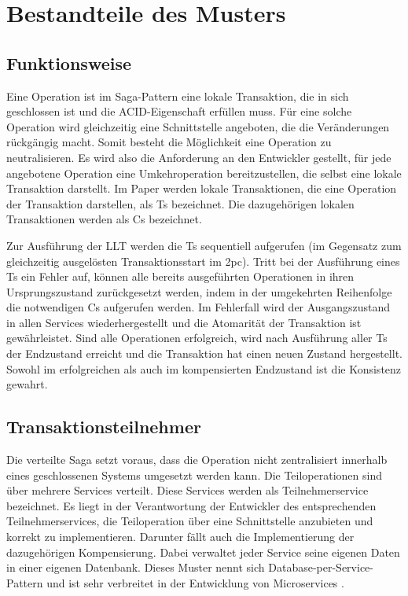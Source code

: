 \section{Bestandteile des Musters}
\subsection{Funktionsweise}
Eine Operation ist im Saga-Pattern eine lokale Transaktion, die in sich geschlossen ist und die ACID-Eigenschaft erfüllen muss. Für eine solche Operation wird gleichzeitig eine Schnittstelle angeboten, die die Veränderungen rückgängig macht. Somit besteht die Möglichkeit eine Operation zu neutralisieren. Es wird also die Anforderung an den Entwickler gestellt, für jede angebotene Operation eine Umkehroperation bereitzustellen, die selbst eine lokale Transaktion darstellt. 
Im Paper werden lokale Transaktionen, die eine Operation der Transaktion darstellen, als Ts bezeichnet. Die dazugehörigen lokalen Transaktionen werden als Cs bezeichnet. 

Zur Ausführung der LLT werden die Ts sequentiell aufgerufen (im Gegensatz zum gleichzeitig ausgelösten Transaktionsstart im \acrshort{2pc}). Tritt bei der Ausführung eines Ts ein Fehler auf, können alle bereits ausgeführten Operationen in ihren Ursprungszustand zurückgesetzt werden, indem in der umgekehrten Reihenfolge die notwendigen Cs aufgerufen werden. Im Fehlerfall wird der Ausgangszustand in allen Services wiederhergestellt und die Atomarität der Transaktion ist gewährleistet. Sind alle Operationen erfolgreich, wird nach Ausführung aller Ts der Endzustand erreicht und die Transaktion hat einen neuen Zustand hergestellt. Sowohl im erfolgreichen als auch im kompensierten Endzustand ist die Konsistenz gewahrt.

\subsection{Transaktionsteilnehmer}
Die verteilte Saga setzt voraus, dass die Operation nicht zentralisiert innerhalb eines geschlossenen Systems umgesetzt werden kann. Die Teiloperationen sind über mehrere Services verteilt. Diese Services werden als Teilnehmerservice bezeichnet. Es liegt in der Verantwortung der Entwickler des entsprechenden Teilnehmerservices, die Teiloperation über eine Schnittstelle anzubieten und korrekt zu implementieren. Darunter fällt auch die Implementierung der dazugehörigen Kompensierung. Dabei verwaltet jeder Service seine eigenen Daten in einer eigenen Datenbank. Dieses Muster nennt sich Database-per-Service-Pattern und ist sehr verbreitet in der Entwicklung von Microservices \cite{microservices.io.12.01.2024}. 

